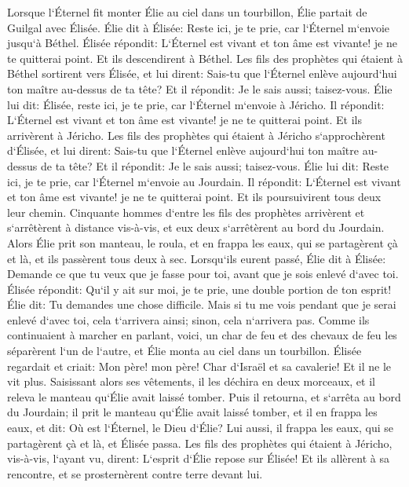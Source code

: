 \verse Lorsque l`Éternel fit monter Élie au ciel dans un tourbillon, Élie partait de Guilgal avec Élisée. 
\verse Élie dit à Élisée: Reste ici, je te prie, car l`Éternel m`envoie jusqu`à Béthel. Élisée répondit: L`Éternel est vivant et ton âme est vivante! je ne te quitterai point. Et ils descendirent à Béthel. 
\verse Les fils des prophètes qui étaient à Béthel sortirent vers Élisée, et lui dirent: Sais-tu que l`Éternel enlève aujourd`hui ton maître au-dessus de ta tête? Et il répondit: Je le sais aussi; taisez-vous. 
\verse Élie lui dit: Élisée, reste ici, je te prie, car l`Éternel m`envoie à Jéricho. Il répondit: L`Éternel est vivant et ton âme est vivante! je ne te quitterai point. Et ils arrivèrent à Jéricho. 
\verse Les fils des prophètes qui étaient à Jéricho s`approchèrent d`Élisée, et lui dirent: Sais-tu que l`Éternel enlève aujourd`hui ton maître au-dessus de ta tête? Et il répondit: Je le sais aussi; taisez-vous. 
\verse Élie lui dit: Reste ici, je te prie, car l`Éternel m`envoie au Jourdain. Il répondit: L`Éternel est vivant et ton âme est vivante! je ne te quitterai point. Et ils poursuivirent tous deux leur chemin. 
\verse Cinquante hommes d`entre les fils des prophètes arrivèrent et s`arrêtèrent à distance vis-à-vis, et eux deux s`arrêtèrent au bord du Jourdain. 
\verse Alors Élie prit son manteau, le roula, et en frappa les eaux, qui se partagèrent çà et là, et ils passèrent tous deux à sec. 
\verse Lorsqu`ils eurent passé, Élie dit à Élisée: Demande ce que tu veux que je fasse pour toi, avant que je sois enlevé d`avec toi. Élisée répondit: Qu`il y ait sur moi, je te prie, une double portion de ton esprit! 
\verse Élie dit: Tu demandes une chose difficile. Mais si tu me vois pendant que je serai enlevé d`avec toi, cela t`arrivera ainsi; sinon, cela n`arrivera pas. 
\verse Comme ils continuaient à marcher en parlant, voici, un char de feu et des chevaux de feu les séparèrent l`un de l`autre, et Élie monta au ciel dans un tourbillon. 
\verse Élisée regardait et criait: Mon père! mon père! Char d`Israël et sa cavalerie! Et il ne le vit plus. Saisissant alors ses vêtements, il les déchira en deux morceaux, 
\verse et il releva le manteau qu`Élie avait laissé tomber. Puis il retourna, et s`arrêta au bord du Jourdain; 
\verse il prit le manteau qu`Élie avait laissé tomber, et il en frappa les eaux, et dit: Où est l`Éternel, le Dieu d`Élie? Lui aussi, il frappa les eaux, qui se partagèrent çà et là, et Élisée passa. 
\verse Les fils des prophètes qui étaient à Jéricho, vis-à-vis, l`ayant vu, dirent: L`esprit d`Élie repose sur Élisée! Et ils allèrent à sa rencontre, et se prosternèrent contre terre devant lui. 

